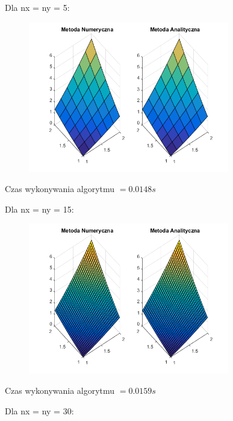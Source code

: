 Dla nx = ny = 5:

\begin{figure}[!ht]
	\begin{center}
		\includegraphics[width=0.78\textwidth]{Lab5/charts/zad3/5x5.png}
	\end{center}
\end{figure}

Czas wykonywania algorytmu $ = 0.0148 s$

Dla nx = ny = 15:

\begin{figure}[!ht]
	\begin{center}
		\includegraphics[width=0.78\textwidth]{Lab5/charts/zad3/15x15.png}
	\end{center}
\end{figure}

Czas wykonywania algorytmu $ = 0.0159 s$

\newpage
Dla nx = ny = 30:

